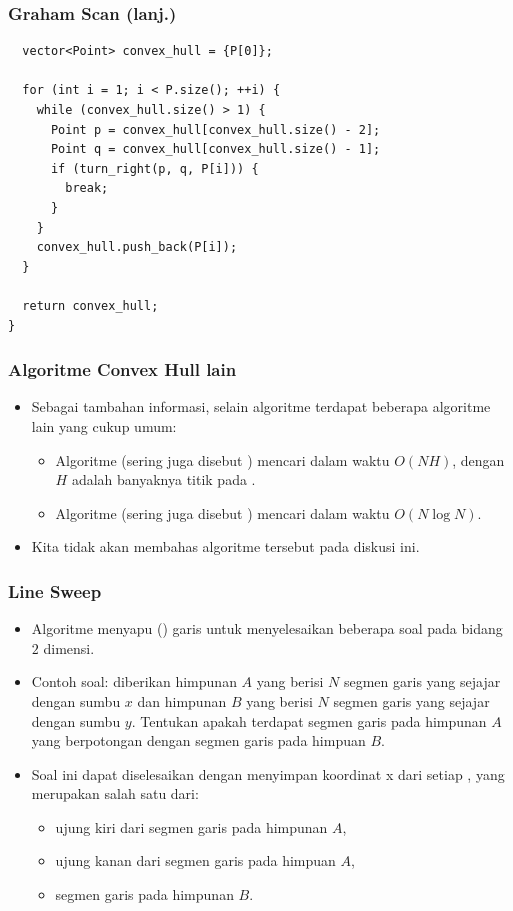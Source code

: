 \begin{frame}[fragile]
\frametitle{Graham Scan (lanj.)}
\begin{lstlisting}
  vector<Point> convex_hull = {P[0]};

  for (int i = 1; i < P.size(); ++i) {
    while (convex_hull.size() > 1) {
      Point p = convex_hull[convex_hull.size() - 2];
      Point q = convex_hull[convex_hull.size() - 1];
      if (turn_right(p, q, P[i])) {
        break;
      }
    }
    convex_hull.push_back(P[i]);
  }

  return convex_hull;
}
\end{lstlisting}
\end{frame}

\begin{frame}
\frametitle{Algoritme Convex Hull lain}
\begin{itemize}
  \item Sebagai tambahan informasi, selain algoritme \fGrahamScan terdapat beberapa algoritme lain yang cukup umum:
  \begin{itemize}
    \item Algoritme  (sering juga disebut ) mencari \fconvexHull dalam waktu $O(NH)$, dengan $H$ adalah banyaknya titik pada \fconvexHull.
    \item Algoritme  (sering juga disebut ) mencari \fconvexHull dalam waktu $O(N \log N)$.
  \end{itemize}
  \item Kita tidak akan membahas algoritme tersebut pada diskusi ini.
\end{itemize}
\end{frame}

\begin{frame}[fragile]
\frametitle{Line Sweep}
\begin{itemize}
  \item Algoritme  menyapu (\xspace) garis untuk menyelesaikan beberapa soal pada bidang $2$ dimensi.
  \item Contoh soal: diberikan himpunan $A$ yang berisi $N$ segmen garis yang sejajar dengan sumbu $x$ dan himpunan $B$ yang berisi $N$ segmen garis yang sejajar dengan sumbu $y$. Tentukan apakah terdapat segmen garis pada himpunan $A$ yang berpotongan dengan segmen garis pada himpuan $B$.
  \item Soal ini dapat diselesaikan dengan menyimpan koordinat x dari setiap , yang merupakan salah satu dari:
  \begin{itemize}
    \item ujung kiri dari segmen garis pada himpunan $A$,
    \item ujung kanan dari segmen garis pada himpuan $A$,
    \item segmen garis pada himpunan $B$.
  \end{itemize}
\end{itemize}
\end{frame}

